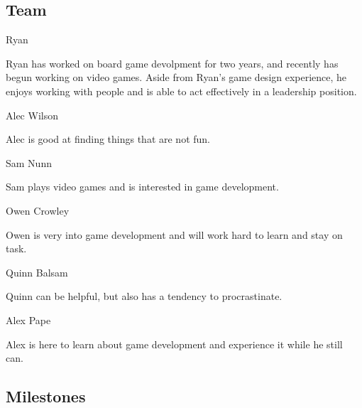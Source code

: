 \documentclass[11pt]{article}
\begin{document}
\subsection{{\color{blue}Team}}

{\large {\color{orange}Ryan}}

Ryan has worked on board game devolpment for two years, and recently has begun working on video games. Aside from Ryan's game design experience, he enjoys working with people and is able to act effectively in a leadership position.

{\large {\color{orange}Alec Wilson}}

Alec is good at finding things that are not fun.


{\large {\color{orange}Sam Nunn}}

Sam plays video games and is interested in game development.

{\large {\color{orange}Owen Crowley}}

Owen is very into game development and will work hard to learn and stay on task.

{\large {\color{orange}Quinn Balsam}}

Quinn can be helpful, but also has a tendency to procrastinate.

{\large {\color{orange}Alex Pape}}

Alex is here to learn about game development and experience it while he still can.

\subsection{{\color{blue}Milestones}}
\end{document}
